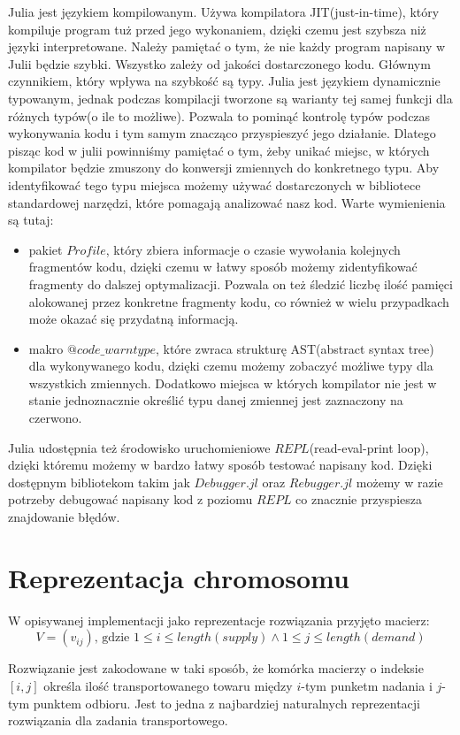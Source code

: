 Julia jest językiem kompilowanym. Używa kompilatora JIT(just-in-time), który kompiluje program tuż przed jego wykonaniem, dzięki czemu jest szybsza 
niż języki interpretowane. Należy pamiętać o tym, że nie każdy program napisany w Julii będzie szybki. Wszystko zależy od jakości dostarczonego kodu.
Głównym czynnikiem, który wpływa na szybkość są typy. Julia jest językiem dynamicznie typowanym, jednak podczas kompilacji tworzone są warianty tej samej 
funkcji dla różnych typów(o ile to możliwe). Pozwala to pominąć kontrolę typów podczas wykonywania kodu i tym samym znacząco przyspieszyć jego działanie.
Dlatego pisząc kod w julii powinniśmy pamiętać o tym, żeby unikać miejsc, w których kompilator będzie zmuszony do konwersji zmiennych do konkretnego typu. 
Aby identyfikować tego typu miejsca możemy używać dostarczonych w bibliotece standardowej narzędzi, które pomagają analizować nasz kod. 
Warte wymienienia są tutaj:
\begin{itemize}
    \item pakiet $Profile$, który zbiera informacje o czasie wywołania kolejnych fragmentów kodu, dzięki czemu w łatwy sposób 
    możemy zidentyfikować fragmenty do dalszej optymalizacji. Pozwala on też śledzić liczbę ilość pamięci alokowanej przez konkretne fragmenty 
    kodu, co również w wielu przypadkach może okazać się przydatną informacją.
    \item makro $@code\_warntype$, które zwraca strukturę AST(abstract syntax tree) dla wykonywanego kodu, dzięki czemu możemy zobaczyć możliwe typy dla wszystkich zmiennych. 
    Dodatkowo miejsca w których kompilator nie jest w stanie jednoznacznie określić typu danej zmiennej jest zaznaczony na czerwono.
\end{itemize}

Julia udostępnia też środowisko uruchomieniowe $REPL$(read-eval-print loop), dzięki któremu możemy w bardzo łatwy sposób testować napisany kod. 
Dzięki dostępnym bibliotekom takim jak $Debugger.jl$ oraz $Rebugger.jl$ możemy w razie potrzeby debugować napisany kod z poziomu $REPL$ co 
znacznie przyspiesza znajdowanie błędów.


\section{Reprezentacja chromosomu}
W opisywanej implementacji jako reprezentacje rozwiązania przyjęto macierz:
$$V = (v_{ij}) \text{, gdzie } 1 \le i \le length(supply) \land 1 \le j \le length(demand)$$

Rozwiązanie jest zakodowane w taki sposób, że komórka macierzy o indeksie $[i, j]$ określa ilość transportowanego towaru 
między $i$-tym punketm nadania i $j$-tym punktem odbioru. Jest to jedna z najbardziej naturalnych reprezentacji rozwiązania 
dla zadania transportowego.

